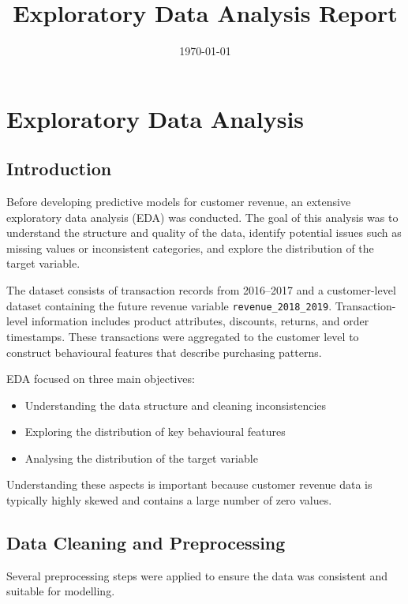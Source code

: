 \documentclass{article}
\title{Exploratory Data Analysis Report}
\author{}
\date{\today}
\begin{document}
\maketitle

\tableofcontents

\section{Exploratory Data Analysis}

\subsection{Introduction}

Before developing predictive models for customer revenue, an extensive exploratory data analysis (EDA) was conducted. The goal of this analysis was to understand the structure and quality of the data, identify potential issues such as missing values or inconsistent categories, and explore the distribution of the target variable.

The dataset consists of transaction records from 2016--2017 and a customer-level dataset containing the future revenue variable \texttt{revenue\_2018\_2019}. Transaction-level information includes product attributes, discounts, returns, and order timestamps. These transactions were aggregated to the customer level to construct behavioural features that describe purchasing patterns.

EDA focused on three main objectives:

\begin{itemize}
\item Understanding the data structure and cleaning inconsistencies
\item Exploring the distribution of key behavioural features
\item Analysing the distribution of the target variable
\end{itemize}

Understanding these aspects is important because customer revenue data is typically highly skewed and contains a large number of zero values.

\subsection{Data Cleaning and Preprocessing}

Several preprocessing steps were applied to ensure the data was consistent and suitable for modelling.
\end{document}
